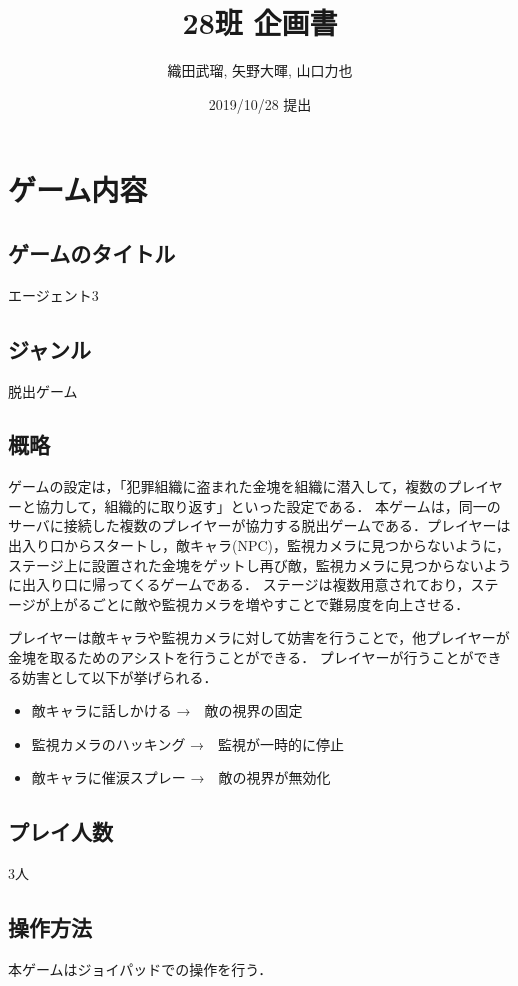 \documentclass{jarticle}
\title{28班 企画書}
\author{織田武瑠, 矢野大暉, 山口力也}
\date{2019/10/28 提出}
\begin{document}
\maketitle

\section{ゲーム内容}
\subsection{ゲームのタイトル}
エージェント3

\subsection{ジャンル}
脱出ゲーム

\subsection{概略}
ゲームの設定は，「犯罪組織に盗まれた金塊を組織に潜入して，複数のプレイヤーと協力して，組織的に取り返す」といった設定である．
本ゲームは，同一のサーバに接続した複数のプレイヤーが協力する脱出ゲームである．プレイヤーは出入り口からスタートし，敵キャラ(NPC)，監視カメラに見つからないように，ステージ上に設置された金塊をゲットし再び敵，監視カメラに見つからないように出入り口に帰ってくるゲームである．
ステージは複数用意されており，ステージが上がるごとに敵や監視カメラを増やすことで難易度を向上させる．

プレイヤーは敵キャラや監視カメラに対して妨害を行うことで，他プレイヤーが金塊を取るためのアシストを行うことができる．
プレイヤーが行うことができる妨害として以下が挙げられる．
\begin{itemize}
\item 敵キャラに話しかける →　敵の視界の固定
\item 監視カメラのハッキング →　監視が一時的に停止
\item 敵キャラに催涙スプレー →　敵の視界が無効化
\end{itemize}

\subsection{プレイ人数}
3人

\subsection{操作方法}
本ゲームはジョイパッドでの操作を行う．
\end{document}
